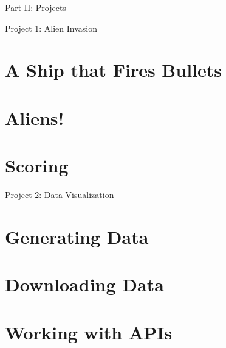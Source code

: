 \documentclass[oneside]{book}
\numberwithin{equation}{section}
\begin{document}

\begin{center}
	\huge Part II: Projects
\end{center}

\begin{center}
	\Large Project 1: Alien Invasion
\end{center}

\section{A Ship that Fires Bullets}


\section{Aliens!}


\section{Scoring}


\begin{center}
	\Large Project 2: Data Visualization
\end{center}

\section{Generating Data}


\section{Downloading Data}


\section{Working with APIs}
\end{document}
